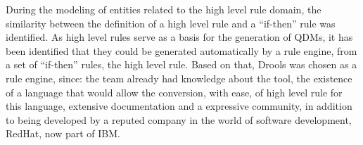 \documentclass[twocolumn]{bmcart}%
\begin{document}

During the modeling of entities related to the high level rule domain, the similarity between the definition of a high level rule and a ``if-then'' rule was identified. As high level rules serve as a basis for the generation of QDMs, it has been identified that they could be generated automatically by a rule engine, from a set of ``if-then'' rules, the high level rule. Based on that, Drools was chosen as a rule engine, since: the team already had knowledge about the tool, the existence of a language that would allow the conversion, with ease, of high level rule for this language, extensive documentation and a expressive community, in addition to being developed by a reputed company in the world of software development, RedHat, now part of IBM.

\end{document}
